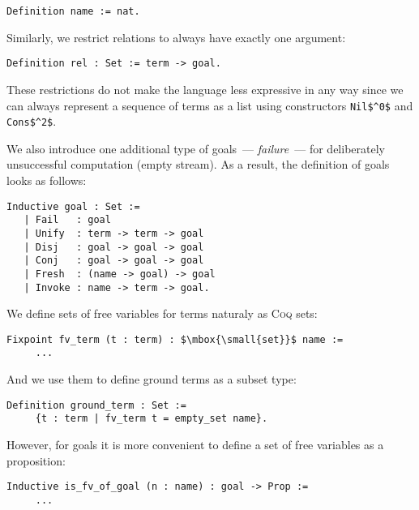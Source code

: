\begin{lstlisting}[language=Coq,basicstyle=\footnotesize]
  Definition name := nat.
\end{lstlisting}

Similarly, we restrict relations to always have exactly one argument:

\begin{lstlisting}[language=Coq,basicstyle=\footnotesize]
   Definition rel : Set := term -> goal.
\end{lstlisting}

These restrictions do not make the language less expressive in any way since we can always represent a sequence of terms as a list using constructors \lstinline|Nil$^0$| and \lstinline|Cons$^2$|.

We also introduce one additional type of goals~--- \emph{failure}~--- for deliberately unsuccessful computation (empty stream). As a result, the definition of goals looks as follows:

\begin{lstlisting}[language=Coq,basicstyle=\footnotesize]
   Inductive goal : Set :=
   | Fail   : goal
   | Unify  : term -> term -> goal
   | Disj   : goal -> goal -> goal
   | Conj   : goal -> goal -> goal
   | Fresh  : (name -> goal) -> goal
   | Invoke : name -> term -> goal.
\end{lstlisting}

We define sets of free variables for terms naturaly as \textsc{Coq} sets: 

\begin{lstlisting}[language=Coq,basicstyle=\footnotesize,mathescape=true]
   Fixpoint fv_term (t : term) : $\mbox{\small{set}}$ name :=
     ...
\end{lstlisting}

And we use them to define ground terms as a subset type:

\begin{lstlisting}[language=Coq,basicstyle=\footnotesize]
   Definition ground_term : Set :=
     {t : term | fv_term t = empty_set name}.
\end{lstlisting}

However, for goals it is more convenient to define a set of free variables as a proposition:

\begin{lstlisting}[language=Coq,basicstyle=\footnotesize]
   Inductive is_fv_of_goal (n : name) : goal -> Prop :=
     ...
\end{lstlisting}

